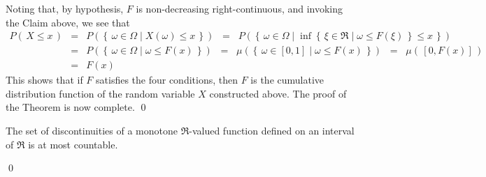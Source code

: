 Noting that, by hypothesis, $F$ is non-decreasing right-continuous, and invoking the Claim above, we see that
\begin{eqnarray*}
P\!\left(\,X \leq x\,\right)
&=& P\!\left(\left\{\,\omega\in\Omega\;\vert\; X(\omega) \leq x\,\right\}\right)
\;\;=\;\; P\!\left(\left\{\,\omega\in\Omega\;\vert\; \inf \left\{\,\xi \in \Re \;\vert\; \omega \leq F(\xi)\,\right\} \leq x\,\right\}\right)
\\
&=& P\!\left(\left\{\,\omega\in\Omega\;\vert\; \omega \leq F(x)\,\right\}\right)
\;\;=\;\; \mu\!\left(\left\{\,\omega\in [0,1] \;\vert\; \omega \leq F(x)\,\right\}\right)
\;\;=\;\; \mu\!\left(\,[0,F(x)]\,\right)
\\
&=& F(x)
\end{eqnarray*}
This shows that if $F$ satisfies the four conditions, then $F$ is the cumulative distribution function of the random variable $X$ constructed above.
The proof of the Theorem is now complete.
\qed

\begin{theorem}
\label{Thm:DarbouxFroda}
\mbox{}\vskip 0.1cm
\noindent
The set of discontinuities of a monotone $\Re$-valued function defined on an interval of $\Re$ is at most countable.
\end{theorem}

\proof

\qed

